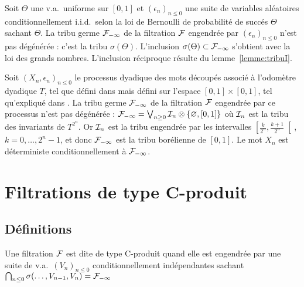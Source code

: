 \documentclass[12pt,a4paper]{article}
\begin{document}
\begin{exemple}\label{exple:echangeable}
Soit $\Theta$ une v.a.\ uniforme sur $[0,1]$ et ${(\epsilon_n)}_{n \leq 0}$ 
une suite de variables aléatoires conditionnellement i.i.d.\ 
selon la loi de Bernoulli de probabilité de succés $\Theta$ sachant 
$\Theta$. 
La tribu germe $\mathcal{F}_{-\infty}$ de la filtration $\mathcal{F}$ engendrée par 
${(\epsilon_n)}_{n \leq 0}$ n'est pas dégénérée : c'est la tribu $\sigma(\Theta)$. 
L'inclusion $\sigma(\Theta) \subset \mathcal{F}_{-\infty}$ s'obtient avec la loi des 
grands nombres. L'inclusion réciproque 
résulte du lemme~\ref{lemme:tribuI}. 
\end{exemple}


\begin{exemple}
Soit ${(X_n, \epsilon_n)}_{n \leq 0}$ le processus dyadique des mots découpés 
associé à l'odomètre dyadique $T$, tel que défini dans \cite{LauXLV} mais 
défini sur l'espace $[0,1] \times [0,1]$, tel qu'expliqué dans \cite{LauScale}.
 La tribu germe $\mathcal{F}_{-\infty}$ de la filtration $\mathcal{F}$ engendrée par 
ce processus n'est pas dégénérée : 
$\mathcal{F}_{-\infty} = \bigvee_{n \geq 0} \mathcal{I}_n \otimes \{\varnothing, [0,1]\}$ 
où $\mathcal{I}_n$ est la tribu des invariants de $T^{2^n}$. 
Or $\mathcal{I}_n$ est la tribu engendrée par les intervalles 
 $\left[\frac{k}{2^n}, \frac{k+1}{2^n}\right[$, $k=0, \ldots, 2^{n}-1$, 
et donc $\mathcal{F}_{-\infty}$ est la tribu borélienne de $[0,1]$. 
Le mot $X_n$ est déterministe conditionnellement à $\mathcal{F}_{-\infty}$.
\end{exemple}



\section{Filtrations de type C-produit}

\subsection{Définitions}

\begin{definition}
Une filtration $\mathcal{F}$ est dite de type C-produit quand elle est engendrée par 
une suite de v.a.\ ${(V_n)}_{n \leq 0}$  conditionnellement indépendantes 
sachant $\bigcap_{n \leq 0}\sigma(\ldots, V_{n-1}, V_n) = \mathcal{F}_{-\infty}$
\end{definition}
\end{document}
